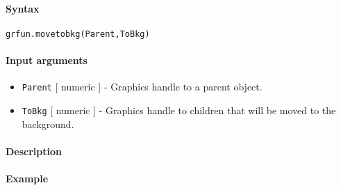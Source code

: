 


	\paragraph{Syntax}

\begin{verbatim}
grfun.movetobkg(Parent,ToBkg)
\end{verbatim}

\paragraph{Input arguments}

\begin{itemize}
\item
  \texttt{Parent} {[} numeric {]} - Graphics handle to a parent object.
\item
  \texttt{ToBkg} {[} numeric {]} - Graphics handle to children that will
  be moved to the background.
\end{itemize}

\paragraph{Description}

\paragraph{Example}


